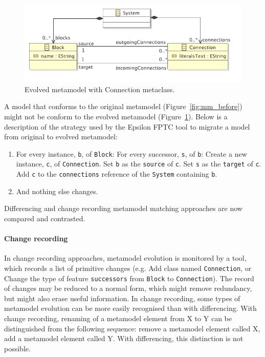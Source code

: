 \begin{figure}[htbp]
  \centering
  \includegraphics[scale=0.75]{4.Analysis/fptc_after.pdf}
  \caption{Evolved metamodel with Connection metaclass.}
  \label{fig:mm_after}
\end{figure}

A model that conforms to the original metamodel (Figure~\ref{fig:mm_before}) might not be conform to the evolved metamodel (Figure~\ref{fig:mm_after}). Below is a description of the strategy used by the Epsilon FPTC tool to migrate a model from original to evolved metamodel:

\begin{enumerate}
	\item For every instance, \texttt{b}, of \texttt{Block}:
		\subitem For every successor, \texttt{s}, of \texttt{b}:
			\subsubitem Create a new instance, \texttt{c}, of \texttt{Connection}.
			\subsubitem Set \texttt{b} as the \texttt{source} of \texttt{c}.
			\subsubitem Set \texttt{s} as the \texttt{target} of \texttt{c}.
			\subsubitem Add \texttt{c} to the \texttt{connections} reference of the \texttt{System} containing \texttt{b}.
	\item And nothing else changes.
\end{enumerate}


Differencing and change recording metamodel matching approaches are now compared and contrasted. 

\paragraph{Change recording}
In change recording approaches, metamodel evolution is monitored by a tool, which records a list of primitive changes (e.g. Add class named \texttt{Connection}, or Change the type of feature \texttt{successors} from \texttt{Block} to \texttt{Connection}). The record of changes may be reduced to a normal form, which might remove redundancy, but might also erase useful information. In change recording, some types of metamodel evolution can be more easily recognised than with differencing. With change recording, renaming of a metamodel element from X to Y can be distinguished from the following sequence: remove a metamodel element called X, add a metamodel element called Y. With differencing, this distinction is not possible.


